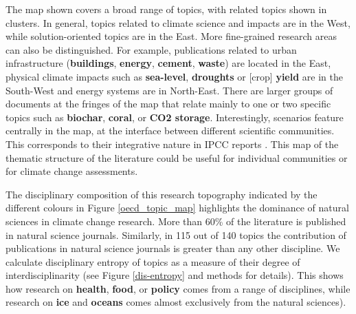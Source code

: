 \documentclass{article}
\begin{document}
\begin{linenumbers}
		
		
		The map shown covers a broad range of topics, with related topics shown in clusters. In general, topics related to climate science and impacts are in the West, while solution-oriented topics are in the East. More fine-grained research areas can also be distinguished. For example, publications related to urban infrastructure (\textbf{buildings}, \textbf{energy}, \textbf{cement}, \textbf{waste}) are located in the East, physical climate impacts such as \textbf{sea-level}, \textbf{droughts}  or [crop] \textbf{yield} are in the South-West and energy systems are in North-East. There are larger groups of documents at the fringes of the map that relate mainly to one or two specific topics such as \textbf{biochar}, \textbf{coral}, or \textbf{CO2 storage}. Interestingly, scenarios feature centrally in the map, at the interface between different scientific communities. This corresponds to their integrative nature in IPCC reports \cite{Moss2010}. This map of the thematic structure of the literature could be useful for individual communities or for climate change assessments.
		
		
		The disciplinary composition of this research topography indicated by the different colours in Figure \ref{oecd_topic_map} highlights the dominance of natural sciences in climate change research. More than 60\% of the literature is published in natural science journals. Similarly, in 115 out of 140 topics the contribution of publications in natural science journals is greater than any other discipline. We calculate disciplinary entropy of topics as a measure of their degree of interdisciplinarity (see Figure \ref{dis-entropy} and methods for details). This shows how research on \textbf{health}, \textbf{food}, or \textbf{policy} comes from a range of disciplines, while research on \textbf{ice} and \textbf{oceans} comes almost exclusively from the natural sciences). 
		

\end{linenumbers}
\end{document}
